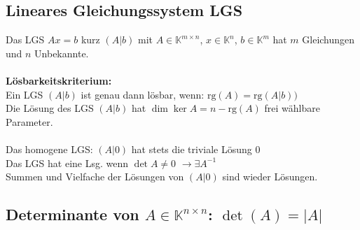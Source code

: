 \documentclass[7pt,a4paper]{scrartcl}
\begin{document}
\begin{multicols}{3}
\subsection{Lineares Gleichungssystem LGS}
Das LGS $Ax=b$ kurz $(A|b)$ mit $A\in \mathbb K^{m\times n}$, $x\in \mathbb K^n$, $b\in \mathbb K^m$ hat $m$ Gleichungen und $n$ Unbekannte.\\
\\
\textbf{Lösbarkeitskriterium:}\\
Ein LGS $(A|b)$ ist genau dann lösbar, wenn: $\mathrm{rg}(A)=\mathrm{rg}(A|b))$\\
Die Lösung des LGS $(A|b)$ hat $\dim{\ker A} = n-\mathrm{rg}(A)$ frei wählbare Parameter.\\
\\
Das homogene LGS: $(A|0)$ hat stets die triviale Lösung $0$\\
Das LGS hat eine Lsg. wenn $\det A \not= 0$ \quad $\rightarrow \exists A^{-1}$ \\
Summen und Vielfache der Lösungen von $(A|0)$ sind wieder Lösungen.

\subsection{Determinante von $A\in \mathbb K^{n\times n}$: $\det(A)=|A|$}


\end{multicols}
\end{document}
